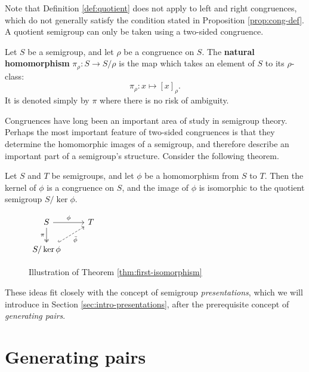 Note that Definition \ref{def:quotient} does not apply to left and right
congruences, which do not generally satisfy the condition stated in Proposition
\ref{prop:cong-def}.  A quotient semigroup can only be taken using a two-sided
congruence.

\begin{definition}
  \label{def:natural-homomorphism}
  Let $S$ be a semigroup, and let $\rho$ be a congruence on $S$.  The
  \textbf{natural homomorphism} $\pi_\rho: S \to S / \rho$ is the map which
  takes an element of $S$ to its $\rho$-class:
  $$\pi_\rho: x \mapsto [x]_\rho.$$
  It is denoted simply by $\pi$ where there is no risk of ambiguity.
\end{definition}

Congruences have long been an important area of study in semigroup theory.
Perhaps the most important feature of two-sided congruences is that they
determine the homomorphic images of a semigroup, and therefore describe an
important part of a semigroup's structure.  Consider the following theorem.

\begin{theorem}
  \label{thm:first-isomorphism}
  Let $S$ and $T$ be semigroups, and let $\phi$ be a homomorphism from $S$ to
  $T$.  Then the kernel of $\phi$ is a congruence on $S$, and the image of
  $\phi$ is isomorphic to the quotient semigroup $S / \ker{\phi}$.
\end{theorem}

\begin{figure}[h]
  \centering
  $
  \begin{tikzcd}
    S \ar[d, two heads, "\pi"'] \ar[r, "\phi"] & T \\
    S / \ker{\phi} \ar[ur, dashed, hook, "\bar\phi"']
  \end{tikzcd}
  $
  \caption{Illustration of Theorem \ref{thm:first-isomorphism}}
  \label{fig:first-isomorphism-theorem}
\end{figure}
These ideas fit closely with the concept of semigroup \textit{presentations},
which we will introduce in Section \ref{sec:intro-presentations}, after the
prerequisite concept of \textit{generating pairs}.

\section{Generating pairs}
\label{sec:intro-gen-pairs}

